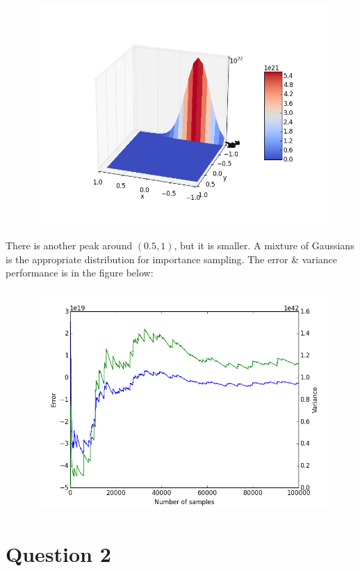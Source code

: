 \documentclass[11pt]{article} %
\begin{document}
\begin{figure}[h!]
	\centering
		\includegraphics[scale = 0.5]{V_surface.png}
\end{figure}

There is another peak around $(0.5, 1)$, but it is smaller. A mixture of Gaussians is the appropriate distribution for importance sampling. The error \& variance performance is in the figure below:

\begin{figure}[h!]
	\centering
		\includegraphics[scale = 0.5]{IS_err_var.png}
\end{figure}

\section{Question 2}
\end{document}
